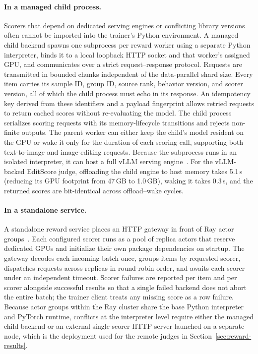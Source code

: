 \paragraph{In a managed child process.}
Scorers that depend on dedicated serving engines or conflicting library versions often cannot be imported into the trainer's Python environment.
A managed child backend spawns one subprocess per reward worker using a separate Python interpreter, binds it to a local loopback HTTP socket and that worker's assigned GPU, and communicates over a strict request--response protocol.
Requests are transmitted in bounded chunks independent of the data-parallel shard size.
Every item carries its sample ID, group ID, source rank, behavior version, and scorer version, all of which the child process must echo in its response.
An idempotency key derived from these identifiers and a payload fingerprint allows retried requests to return cached scores without re-evaluating the model.
The child process serializes scoring requests with its memory-lifecycle transitions and rejects non-finite outputs.
The parent worker can either keep the child's model resident on the GPU or wake it only for the duration of each scoring call, supporting both text-to-image and image-editing requests.
Because the subprocess runs in an isolated interpreter, it can host a full vLLM serving engine~\citep{kwon2023vllm}.
For the vLLM-backed EditScore judge, offloading the child engine to host memory takes 5.1\,s (reducing its GPU footprint from 47\,GB to 1.0\,GB), waking it takes 0.3\,s, and the returned scores are bit-identical across offload--wake cycles.

\paragraph{In a standalone service.}
A standalone reward service places an HTTP gateway in front of Ray actor groups~\citep{moritz2018ray}.
Each configured scorer runs as a pool of replica actors that reserve dedicated GPUs and initialize their own package dependencies on startup.
The gateway decodes each incoming batch once, groups items by requested scorer, dispatches requests across replicas in round-robin order, and awaits each scorer under an independent timeout.
Scorer failures are reported per item and per scorer alongside successful results so that a single failed backend does not abort the entire batch; the trainer client treats any missing score as a row failure.
Because actor groups within the Ray cluster share the base Python interpreter and PyTorch runtime, conflicts at the interpreter level require either the managed child backend or an external single-scorer HTTP server launched on a separate node, which is the deployment used for the remote judges in Section~\ref{sec:reward-results}.

